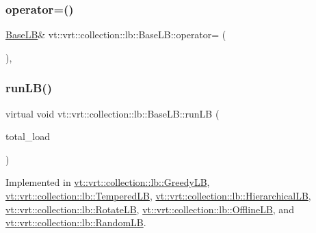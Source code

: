 \subsubsection{\texorpdfstring{operator=()}{operator=()}\hspace{0.1cm}{\footnotesize\ttfamily [2/2]}}
{\footnotesize\ttfamily \hyperlink{structvt_1_1vrt_1_1collection_1_1lb_1_1_base_l_b}{Base\+LB}\& vt\+::vrt\+::collection\+::lb\+::\+Base\+L\+B\+::operator= (\begin{DoxyParamCaption}\item[{\hyperlink{structvt_1_1vrt_1_1collection_1_1lb_1_1_base_l_b}{Base\+LB} \&\&}]{ }\end{DoxyParamCaption})\hspace{0.3cm}{\ttfamily [default]}, {\ttfamily [noexcept]}}

\mbox{\label{structvt_1_1vrt_1_1collection_1_1lb_1_1_base_l_b_a7caaf2483f046927fd7534a084a8c1b2}} 
\subsubsection{\texorpdfstring{run\+L\+B()}{runLB()}}
{\footnotesize\ttfamily virtual void vt\+::vrt\+::collection\+::lb\+::\+Base\+L\+B\+::run\+LB (\begin{DoxyParamCaption}\item[{\hyperlink{namespacevt_a876a9d0cd5a952859c72de8a46881442}{Time\+Type}}]{total\+\_\+load }\end{DoxyParamCaption})\hspace{0.3cm}{\ttfamily [pure virtual]}}



Implemented in \hyperlink{structvt_1_1vrt_1_1collection_1_1lb_1_1_greedy_l_b_add276be59c95400117efe3e4187f4227}{vt\+::vrt\+::collection\+::lb\+::\+Greedy\+LB}, \hyperlink{structvt_1_1vrt_1_1collection_1_1lb_1_1_tempered_l_b_a18efa54b58d642d8bb1cd373514e814f}{vt\+::vrt\+::collection\+::lb\+::\+Tempered\+LB}, \hyperlink{structvt_1_1vrt_1_1collection_1_1lb_1_1_hierarchical_l_b_a8678acfa7b587e6003a4701def240595}{vt\+::vrt\+::collection\+::lb\+::\+Hierarchical\+LB}, \hyperlink{structvt_1_1vrt_1_1collection_1_1lb_1_1_rotate_l_b_af54a83925b1bbe05052c475523110e98}{vt\+::vrt\+::collection\+::lb\+::\+Rotate\+LB}, \hyperlink{structvt_1_1vrt_1_1collection_1_1lb_1_1_offline_l_b_a8621ca0e36932e4271f62d9d8078bf3e}{vt\+::vrt\+::collection\+::lb\+::\+Offline\+LB}, and \hyperlink{structvt_1_1vrt_1_1collection_1_1lb_1_1_random_l_b_a307d5e63c39550c4ab79e5a770b0c9fb}{vt\+::vrt\+::collection\+::lb\+::\+Random\+LB}.

